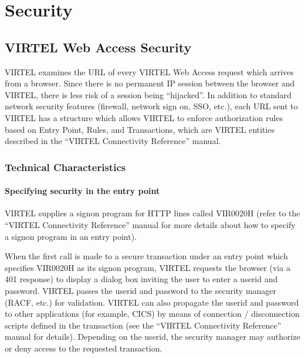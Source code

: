 \documentclass[letterpaper,10pt,english]{sphinxmanual}
\begin{document}


\chapter{Security}
\label{\detokenize{User_Guide:id11}}\label{\detokenize{User_Guide:v457ug-security}}

\section{VIRTEL Web Access Security}
\label{\detokenize{User_Guide:virtel-web-access-security}}
VIRTEL examines the URL of every VIRTEL Web Access request which arrives from a browser. Since there is no
permanent IP session between the browser and VIRTEL, there is less risk of a session being “hijacked”. In addition to
standard network security features (firewall, network sign on, SSO, etc.), each URL sent to VIRTEL has a structure which
allows VIRTEL to enforce authorization rules based on Entry Point, Rules, and Transactions, which are VIRTEL entities
described in the “VIRTEL Connectivity Reference” manual.


\subsection{Technical Characteristics}
\label{\detokenize{User_Guide:technical-characteristics}}

\subsubsection{Specifying security in the entry point}
\label{\detokenize{User_Guide:specifying-security-in-the-entry-point}}
VIRTEL supplies a signon program for HTTP lines called VIR0020H (refer to the “VIRTEL Connectivity Reference” manual
for more details about how to specify a signon program in an entry point).

When the first call is made to a secure transaction under an entry point which specifies VIR0020H as its signon
program, VIRTEL requests the browser (via a 401 response) to display a dialog box inviting the user to enter a userid
and password. VIRTEL passes the userid and password to the security manager (RACF, etc.) for validation. VIRTEL can
also propagate the userid and password to other applications (for example, CICS) by means of connection /
disconnection scripts defined in the transaction (see the “VIRTEL Connectivity Reference” manual for details).
Depending on the userid, the security manager may authorize or deny access to the requested transaction.
\end{document}
